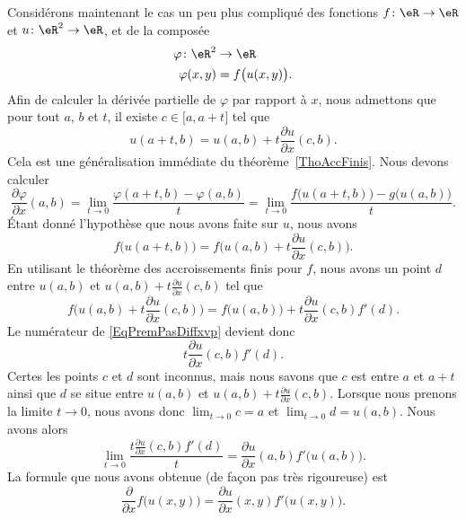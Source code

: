 Considérons maintenant le cas un peu plus compliqué des fonctions $f\colon \eR\to \eR$ et $u\colon \eR^2\to \eR$, et de la composée
\begin{equation}
	\begin{aligned}
		\varphi\colon \eR^2&\to \eR \\
		\varphi(x,y)&= f\big( u(x,y) \big).
	\end{aligned}
\end{equation}
Afin de calculer la dérivée partielle de $\varphi$ par rapport à $x$, nous admettons que pour tout $a$, $b$ et $t$, il existe $c\in\mathopen[ a , a+t \mathclose]$ tel que
\begin{equation}
	u(a+t,b)=u(a,b)+t\frac{ \partial u }{ \partial x }(c,b).
\end{equation}
Cela est une généralisation immédiate du théorème~\ref{ThoAccFinis}. Nous devons calculer
\begin{equation}		\label{EqPremPasDiffxvp}
	\frac{ \partial \varphi }{ \partial x }(a,b)=\lim_{t\to 0} \frac{ \varphi(a+t,b)-\varphi(a,b) }{ t }=\lim_{t\to 0} \frac{ f\big( u(a+t,b) \big)-g\big( u(a,b) \big) }{ t }.
\end{equation}
Étant donné l'hypothèse que nous avons faite sur $u$, nous avons
\begin{equation}
	f\big( u(a+t,b) \big)=f\big( u(a,b)+t\frac{ \partial u }{ \partial x }(c,b) \big).
\end{equation}
En utilisant le théorème des accroissements finis pour $f$, nous avons un point $d$ entre $u(a,b)$ et $u(a,b)+t\frac{ \partial u }{ \partial x }(c,b)$ tel que
\begin{equation}
	f\big( u(a,b)+t\frac{ \partial u }{ \partial x }(c,b) \big)=f\big( u(a,b) \big)+t\frac{ \partial u }{ \partial x }(c,b)f'(d).
\end{equation}
Le numérateur de \eqref{EqPremPasDiffxvp} devient donc
\begin{equation}
	t\frac{ \partial u }{ \partial x }(c,b)f'(d).
\end{equation}
Certes les points $c$ et $d$ sont inconnus, mais nous savons que $c$ est entre $a$ et $a+t$ ainsi que $d$ se situe entre $u(a,b)$ et $u(a,b)+t\frac{ \partial u }{ \partial x }(c,b)$. Lorsque nous prenons la limite $t\to 0$, nous avons donc $\lim_{t\to 0} c=a$ et $\lim_{t\to 0} d=u(a,b)$. Nous avons alors
\begin{equation}
	\lim_{t\to 0} \frac{ t\frac{ \partial u }{ \partial x }(c,b)f'(d) }{ t }=\frac{ \partial u }{ \partial x }(a,b)f'\big( u(a,b) \big).
\end{equation}
La formule que nous avons obtenue (de façon pas très rigoureuse) est
\begin{equation}
	\frac{ \partial  }{ \partial x }f\big( u(x,y) \big)=\frac{ \partial u }{ \partial x }(x,y)f'\big( u(x,y) \big).
\end{equation}

